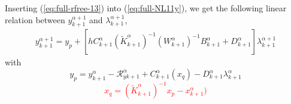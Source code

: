 Inserting (\ref{eq:full-rfree-13}) into (\ref{eq:full-NL11y}), we get the following linear relation between $y^{\alpha+1}_{k+1}$ and $\lambda^{\alpha+1}_{k+1}$, 
\begin{equation}
   \begin{array}{l}
 y^{\alpha+1}_{k+1} = y_p + \left[ h  C^{\alpha}_{k+1} (\tilde K^{\alpha}_{k+1})^{-1}( W^{\alpha}_{k+1})^{-1}  B^{\alpha}_{k+1} + D^{\alpha}_{k+1} \right]\lambda^{\alpha+1}_{k+1}
   \end{array}
\end{equation}
with 
\begin{equation}\boxed{
y_p = y^{\alpha}_{k+1} -\mathcal R^{\alpha}_{yk+1} + C^{\alpha}_{k+1}(x_q) -
D^{\alpha}_{k+1} \lambda^{\alpha}_{k+1} }
\end{equation}
\textcolor{red}{
  \begin{equation}
   \boxed{ x_q=(\tilde K^{\alpha}_{k+1})^{-1}x_p -x^{\alpha}_{k+1})\label{eq:full-xqq}}
  \end{equation}
}








\clearpage


